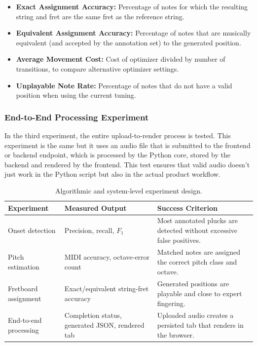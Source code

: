 \documentclass[a4paper, 12pt, titlepage]{article}
\begin{document}
\begin{itemize}
    \item \textbf{Exact Assignment Accuracy:} Percentage of notes for which the resulting string and fret are the same fret as the reference string.
    \item \textbf{Equivalent Assignment Accuracy:} Percentage of notes that are musically equivalent (and accepted by the annotation set) to the generated position.
    \item \textbf{Average Movement Cost:} Cost of optimizer divided by number of transitions, to compare alternative optimizer settings.
    \item \textbf{Unplayable Note Rate:} Percentage of notes that do not have a valid position when using the current tuning.
\end{itemize}

\subsubsection{End-to-End Processing Experiment}

In the third experiment, the entire upload-to-render process is tested. This experiment is the same but it uses an audio file that is submitted to the frontend or backend endpoint, which is processed by the Python core, stored by the backend and rendered by the frontend. This test ensures that valid audio doesn't just work in the Python script but also in the actual product workflow.

\begin{table}[H]
    \centering
    \begin{tabular}{|p{}|p{}|p{}|}
        \hline
        \textbf{Experiment} & \textbf{Measured Output} & \textbf{Success Criterion} \\
        \hline
        Onset detection & Precision, recall, $F_1$ & Most annotated plucks are detected without excessive false positives. \\
        \hline
        Pitch estimation & MIDI accuracy, octave-error count & Matched notes are assigned the correct pitch class and octave. \\
        \hline
        Fretboard assignment & Exact/equivalent string-fret accuracy & Generated positions are playable and close to expert fingering. \\
        \hline
        End-to-end processing & Completion status, generated JSON, rendered tab & Uploaded audio creates a persisted tab that renders in the browser. \\
        \hline
    \end{tabular}
    \caption{Algorithmic and system-level experiment design.}
    \label{tab:tabee_experiment_design}
\end{table}
\end{document}
